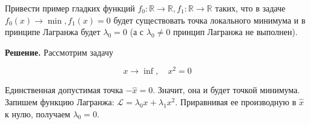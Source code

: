 \begin{task}
Привести пример гладких функций $f_{0}: \mathbb{R} \rightarrow \mathbb{R}, f_{1}: \mathbb{R} \rightarrow \mathbb{R}$ таких, что в задаче $f_{0}(x) 
\rightarrow \min , f_{1}(x)=0$ будет существовать точка локального минимума и в принципе Лагранжа будет $\lambda_{0}=0$ (а с $\lambda_{0} \neq 0$ принцип Лагранжа не выполнен).

\textbf{Решение.} Рассмотрим задачу

$$
x \rightarrow \inf , \quad x^{2}=0
$$

Единственная допустимая точка $-\hat{x}=0$. Значит, она и будет точкой минимума. Запишем функцию Лагранжа: $\mathcal{L}=\lambda_{0} x+\lambda_{1} x^{2}$. Приравнивая ее производную в $\hat{x}$ к нулю, получаем $\lambda_{0}=0$.
\end{task}